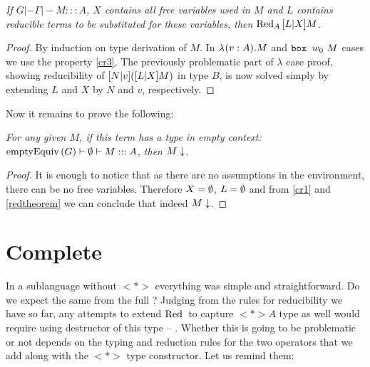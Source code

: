 \begin{theorem}\em
\label{redtheorem}
If $G |- \Gamma |- M ::: A$, $X$ contains all free variables used in $M$ and $L$ contains reducible terms to be substituted for these variables, then
$\Red{\substt{L}{X}{M}}{A}$.
\begin{proof}
By induction on type derivation of $M$. In $\lam{v}{A}{M}$ and $\bbox{w_0}{M}$ cases we use the property \ref{cr3}. The previously problematic part of $\lambda$ case proof, showing reducibility of $\substt{N}{v}{(\substt{L}{X}{M})}$ in type $B$, is now solved simply by extending $L$ and $X$ by $N$ and $v$, respectively.
\end{proof}
\end{theorem}
\newpage
Now it remains to prove the following:
\begin{theorem}\em
For any given $M$, if this term has a type in empty context: $\emptyEq G |- \nnil |- M ::: A$, then $\termin{M}$.
\begin{proof}
It is enough to notice that as there are no assumptions in the environment, there can be no free variables. Therefore $X = \nnil$, $L=\nnil$ and from \ref{cr1} and \ref{redtheorem} we can conclude that indeed $\termin{M}$.
\end{proof}
\end{theorem}

\section{Complete \langLF{}}

In a sublanguage without $<*>$ everything was simple and straightforward. Do we expect the same from the full \langLF{}?  Judging from the rules for reducibility we have so far, any attempts to extend $\Red{}{}$ to capture $<*>A$ type as well would require using destructor of this type -- . Whether this is going to be problematic or not depends on the typing and reduction rules for the two operators that we add along with the $<*>$ type constructor. Let us remind them:

